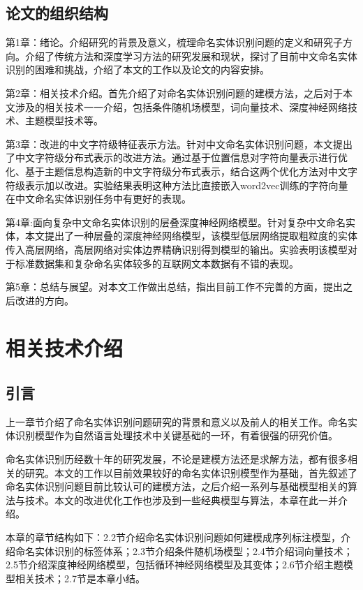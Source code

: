 \documentclass[winfonts,master,oneside,nobackinfo]{njuthesis}
\begin{document}
\section{论文的组织结构}
第1章：绪论。介绍研究的背景及意义，梳理命名实体识别问题的定义和研究子方向。介绍了传统方法和深度学习方法的研究发展和现状，探讨了目前中文命名实体识别的困难和挑战，介绍了本文的工作以及论文的内容安排。

第2章：相关技术介绍。首先介绍了对命名实体识别问题的建模方法，之后对于本文涉及的相关技术一一介绍，包括条件随机场模型，词向量技术、深度神经网络技术、主题模型技术等。

第3章：改进的中文字符级特征表示方法。针对中文命名实体识别问题，本文提出了中文字符级分布式表示的改进方法。通过基于位置信息对字符向量表示进行优化、基于主题信息构造新的中文字符级分布式表示，结合这两个优化方法对中文字符级表示加以改进。实验结果表明这种方法比直接嵌入word2vec训练的字符向量在中文命名实体识别任务中有更好的表现。

第4章:面向复杂中文命名实体识别的层叠深度神经网络模型。针对复杂中文命名实体，本文提出了一种层叠的深度神经网络模型，该模型低层网络提取粗粒度的实体传入高层网络，高层网络对实体边界精确识别得到模型的输出。实验表明该模型对于标准数据集和复杂命名实体较多的互联网文本数据有不错的表现。

第5章：总结与展望。对本文工作做出总结，指出目前工作不完善的方面，提出之后改进的方向。

\chapter{相关技术介绍}

\section{引言}
上一章节介绍了命名实体识别问题研究的背景和意义以及前人的相关工作。命名实体识别模型作为自然语言处理技术中关键基础的一环，有着很强的研究价值。

命名实体识别历经数十年的研究发展，不论是建模方法还是求解方法，都有很多相关的研究。本文的工作以目前效果较好的命名实体识别模型作为基础，首先叙述了命名实体识别问题目前比较认可的建模方法，之后介绍一系列与基础模型相关的算法与技术。本文的改进优化工作也涉及到一些经典模型与算法，本章在此一并介绍。

本章的章节结构如下：2.2节介绍命名实体识别问题如何建模成序列标注模型，介绍命名实体识别的标签体系；2.3节介绍条件随机场模型；2.4节介绍词向量技术；2.5节介绍深度神经网络模型，包括循环神经网络模型及其变体；2.6节介绍主题模型相关技术；2.7节是本章小结。
\end{document}
